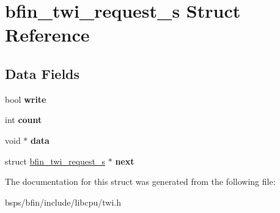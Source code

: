 \hypertarget{structbfin__twi__request__s}{}\section{bfin\+\_\+twi\+\_\+request\+\_\+s Struct Reference}
\label{structbfin__twi__request__s}
\subsection*{Data Fields}
\begin{DoxyCompactItemize}
\item 
\mbox{\label{structbfin__twi__request__s_a2bd91fe6c6bf36e87c116bd67d292ba4}} 
bool {\bfseries write}
\item 
\mbox{\label{structbfin__twi__request__s_a3276b8ab294f2c6c7e82d39880014f3e}} 
int {\bfseries count}
\item 
\mbox{\label{structbfin__twi__request__s_a383016e6fdcb5b1b077c1748853aa81f}} 
void $\ast$ {\bfseries data}
\item 
\mbox{\label{structbfin__twi__request__s_a5cccc0c9cfab88c809049e8f57fa5b7a}} 
struct \mbox{\hyperlink{structbfin__twi__request__s}{bfin\+\_\+twi\+\_\+request\+\_\+s}} $\ast$ {\bfseries next}
\end{DoxyCompactItemize}


The documentation for this struct was generated from the following file\+:\begin{DoxyCompactItemize}
\item 
bsps/bfin/include/libcpu/twi.\+h\end{DoxyCompactItemize}
